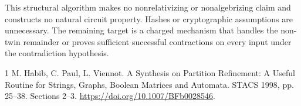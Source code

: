 \documentclass[11pt]{article}
\begin{document}
This structural algorithm makes no nonrelativizing or nonalgebrizing
claim and constructs no natural circuit property. Hashes or cryptographic
assumptions are unnecessary. The remaining target is a charged mechanism
that handles the non-twin remainder or proves sufficient successful
contractions on every input under the contradiction hypothesis.
\begin{thebibliography}{1}
 M. Habib, C. Paul, L. Viennot.
A Synthesis on Partition Refinement: A Useful Routine for Strings,
Graphs, Boolean Matrices and Automata. STACS 1998, pp. 25--38.
Sections 2--3. \url{https://doi.org/10.1007/BFb0028546}.
\end{thebibliography}
\end{document}
